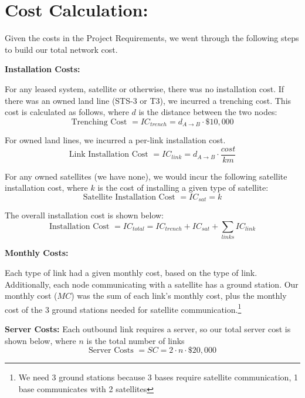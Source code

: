 \documentclass{article}
\begin{document}
\newpage
\section{Cost Calculation:}
\label{sec:Cost}
Given the costs in the Project Requirements, we went through the following steps to build our total network cost.

\noindent \textbf{Installation Costs:} 

For any leased system, satellite or otherwise, there was no installation cost.
If there was an owned land line (STS-3 or T3), we incurred a trenching cost.
This cost is calculated as follows, where $d$ is the distance between the two nodes:
\begin{equation}
\text{Trenching Cost } = IC_{trench} = d_{A \rightarrow B} \cdot \text{\$}10,000
\end{equation}

For owned land lines, we incurred a per-link installation cost.
\begin{equation}
\text{Link Installation Cost } = IC_{link} = d_{A \rightarrow B} \cdot \frac{cost}{km}
\end{equation}

For any owned satellites (we have none), we would incur the following satellite installation cost, where $k$ is the cost of installing a given type of satellite:
\begin{equation}
\text{Satellite Installation Cost } =  IC_{sat} = k
\end{equation}

The overall installation cost is shown below:
\begin{equation}
\text{Installation Cost } = IC_{total} = IC_{trench} + IC_{sat} + \sum_{links} IC_{link} 
\end{equation}

\noindent \textbf{Monthly Costs:}

Each type of link had a given monthly cost, based on the type of link.
Additionally, each node communicating with a satellite has a ground station.
Our monthly cost ($MC$) was the sum of each link's monthly cost, plus the monthly cost of the 3 ground stations needed for satellite communication.\footnote{We need 3 ground stations because 3 bases require satellite communication, 1 base communicates with 2 satellites}
\newline

\noindent \textbf{Server Costs:}
Each outbound link requires a server, so our total server cost is shown below, where $n$ is the total number of links
\begin{equation}
\text{Server Costs } = SC = 2 \cdot n \cdot \$20,000
\end{equation}
\end{document}
